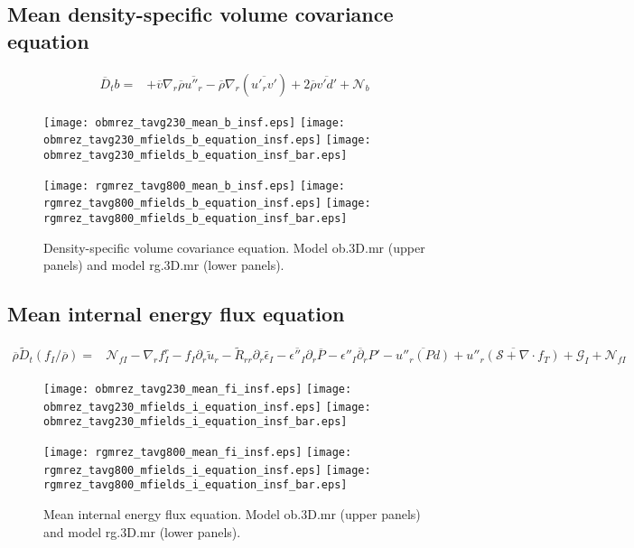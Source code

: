 \documentclass[10pt,paper=a4]{report}
\newcommand{\eht}{\overline}
\newcommand{\fht}{\widetilde}
\newcommand{\fav}{\widetilde}
\def\erho{\eht{\rho}}
\begin{document}
\newpage

\subsection{Mean density-specific volume covariance equation}

\begin{align}
\eht{D}_t b = &  +\eht{v} \nabla_r \eht{\rho} \eht{u''_r} -\eht{\rho}\nabla_r (\eht{u'_r v'}) + 2\eht{\rho}\eht{v'd'}+ {\mathcal N_b} \label{eq:rans_b}
\end{align}

\begin{figure}[!h]
\centerline{
\texttt{[image: obmrez\_tavg230\_mean\_b\_insf.eps]}
\texttt{[image: obmrez\_tavg230\_mfields\_b\_equation\_insf.eps]}
\texttt{[image: obmrez\_tavg230\_mfields\_b\_equation\_insf\_bar.eps]}}

\centerline{
\texttt{[image: rgmrez\_tavg800\_mean\_b\_insf.eps]}
\texttt{[image: rgmrez\_tavg800\_mfields\_b\_equation\_insf.eps]}
\texttt{[image: rgmrez\_tavg800\_mfields\_b\_equation\_insf\_bar.eps]}}
\caption{Density-specific volume covariance equation. Model {\sf ob.3D.mr} (upper panels) and model {\sf rg.3D.mr} (lower panels). \label{fig:b-equation}}
\end{figure}

\newpage

\subsection{Mean internal energy flux equation}

\begin{align}
\erho \fav{D}_t (f_I / \eht{\rho}) = &  {\mathcal N_{fI}} -\nabla_r f_I^r  - f_I \partial_r \fht{u}_r  - \fht{R}_{rr} \partial_r \fht{\epsilon_I} - \eht{\epsilon''_I} \partial_r \eht{P} - \eht{\epsilon''_I \partial_r P'}  - \eht{u''_r \left( P d \right)}  + \overline{u''_r ({\mathcal S} + \nabla \cdot f_T)} + {\mathcal G_I} + {\mathcal N_{fI}}\label{eq:rans_fi}
\end{align}

\begin{figure}[!h]
\centerline{
\texttt{[image: obmrez\_tavg230\_mean\_fi\_insf.eps]}
\texttt{[image: obmrez\_tavg230\_mfields\_i\_equation\_insf.eps]}
\texttt{[image: obmrez\_tavg230\_mfields\_i\_equation\_insf\_bar.eps]}}

\centerline{
\texttt{[image: rgmrez\_tavg800\_mean\_fi\_insf.eps]}
\texttt{[image: rgmrez\_tavg800\_mfields\_i\_equation\_insf.eps]}
\texttt{[image: rgmrez\_tavg800\_mfields\_i\_equation\_insf\_bar.eps]}}
\caption{Mean internal energy flux equation. Model {\sf ob.3D.mr} (upper panels) and model {\sf rg.3D.mr} (lower panels). \label{fig:fi-equation}}
\end{figure}
\end{document}
